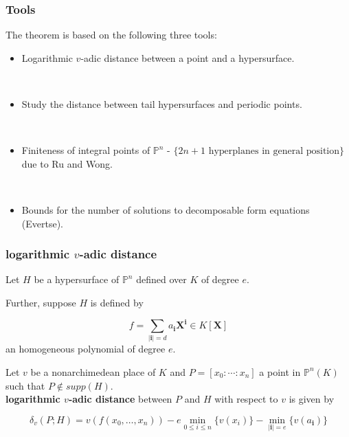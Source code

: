 \documentclass{beamer}
\def\jump{ \quad \\ \vspace{0.7cm} \pause}
\def\PP{{\mathbb P}}
\theoremstyle{thmstyle}
\theoremstyle{thmstyle}
\theoremstyle{mystyle}
\theoremstyle{qstnstyle}
\begin{document}
\begin{frame}
\frametitle{Tools}
The theorem is based on the following three tools:\jump
\begin{itemize}
\item Logarithmic $v$-adic distance between a point and a hypersurface.


\jump

\item Study the distance between tail hypersurfaces and periodic points.

\jump

\item Finiteness of integral points of $\PP^n$ - $\{2n+1 \mbox{ hyperplanes in general position}\}$ due to Ru and Wong.



\jump

\item Bounds for the number of solutions to decomposable form equations (Evertse).
\end{itemize}
\end{frame}





\begin{frame}
\frametitle{logarithmic $v$-adic distance}
Let $H$ be a hypersurface of $\PP^n$ defined over $K$ of degree $e$.

\pause Further, suppose $H$ is defined by 

$$f=\displaystyle\sum_{|\textbf{i}|= d} a_{\textbf{i}}\textbf{X}^{\textbf{i}} \in K[\textbf{X}] $$ an homogeneous polynomial  of degree $e$. 

\pause Let $v$ be a nonarchimedean place of $K$ \pause and $P =[x_0:\cdots : x_n]$ a point in $\PP^n(K)$ \pause such that $P\notin supp(H) $. 
\jump
\textbf{logarithmic $v$-adic distance} between $P$ and $H$ with respect to $v$ is given by

$$\delta_{v}(P;H)=v(f(x_0,\ldots,x_n))-e\min_{0\leq i\leq n}\{ v(x_i)  \}-\min_{|\textbf{i}|=e}\{  v(a_{\textbf{i}})  \}$$
\end{frame}
\end{document}
